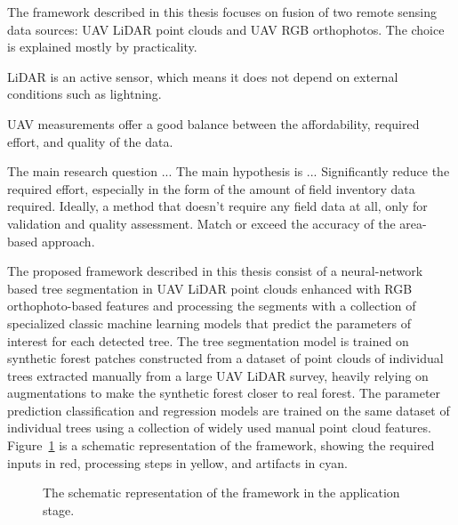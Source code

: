 The framework described in this thesis focuses on fusion of two remote sensing data sources: UAV LiDAR point clouds and UAV RGB orthophotos.
The choice is explained mostly by practicality.

LiDAR is an active sensor, which means it does not depend on external conditions such as lightning.

UAV measurements offer a good balance between the affordability, required effort, and quality of the data.

The main research question ...
The main hypothesis is ...
Significantly reduce the required effort, especially in the form of the amount of field inventory data required.
Ideally, a method that doesn't require any field data at all, only for validation and quality assessment.
Match or exceed the accuracy of the area-based approach.

The proposed framework described in this thesis consist of a neural-network based tree segmentation in UAV LiDAR point clouds enhanced with RGB orthophoto-based features and processing the segments with a collection of specialized classic machine learning models that predict the parameters of interest for each detected tree.
The tree segmentation model is trained on synthetic forest patches constructed from a dataset of point clouds of individual trees extracted manually from a large UAV LiDAR survey, heavily relying on augmentations to make the synthetic forest closer to real forest.
The parameter prediction classification and regression models are trained on the same dataset of individual trees using a collection of widely used manual point cloud features.
Figure~\ref{fig-framework-apply} is a schematic representation of the framework, showing the required inputs in red, processing steps in yellow, and artifacts in cyan.

\begin{figure}
\caption{\label{fig-framework-apply}The schematic representation of the
framework in the application stage.}
\end{figure}

